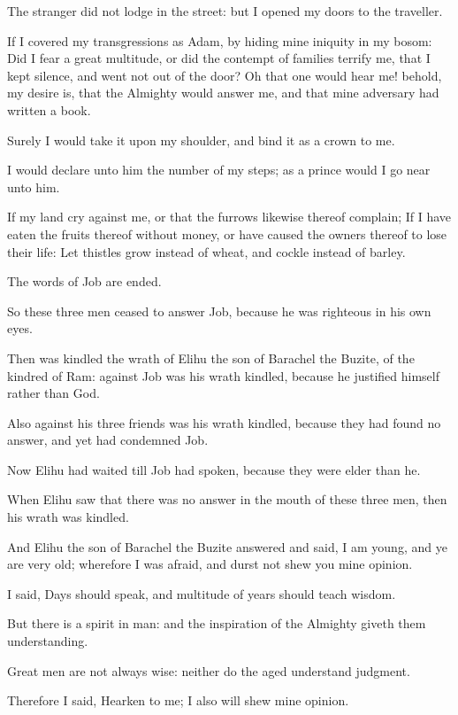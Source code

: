 \Verse The stranger did not lodge in the street: but I opened my doors to the traveller.

\Verse If I covered my transgressions as Adam, by hiding mine iniquity in my bosom: \Verse Did I fear a great multitude, or did the contempt of families terrify me, that I kept silence, and went not out of the door?  \Verse Oh that one would hear me! behold, my desire is, that the Almighty would answer me, and that mine adversary had written a book.

\Verse Surely I would take it upon my shoulder, and bind it as a crown to me.

\Verse I would declare unto him the number of my steps; as a prince would I go near unto him.

\Verse If my land cry against me, or that the furrows likewise thereof complain; \Verse If I have eaten the fruits thereof without money, or have caused the owners thereof to lose their life: \Verse Let thistles grow instead of wheat, and cockle instead of barley.

The words of Job are ended.


\Chapter
\Verse So these three men ceased to answer Job, because he was righteous in his own eyes.

\Verse Then was kindled the wrath of Elihu the son of Barachel the Buzite, of the kindred of Ram: against Job was his wrath kindled, because he justified himself rather than God.

\Verse Also against his three friends was his wrath kindled, because they had found no answer, and yet had condemned Job.

\Verse Now Elihu had waited till Job had spoken, because they were elder than he.

\Verse When Elihu saw that there was no answer in the mouth of these three men, then his wrath was kindled.

\Verse And Elihu the son of Barachel the Buzite answered and said, I am young, and ye are very old; wherefore I was afraid, and durst not shew you mine opinion.

\Verse I said, Days should speak, and multitude of years should teach wisdom.

\Verse But there is a spirit in man: and the inspiration of the Almighty giveth them understanding.

\Verse Great men are not always wise: neither do the aged understand judgment.

\Verse Therefore I said, Hearken to me; I also will shew mine opinion.

